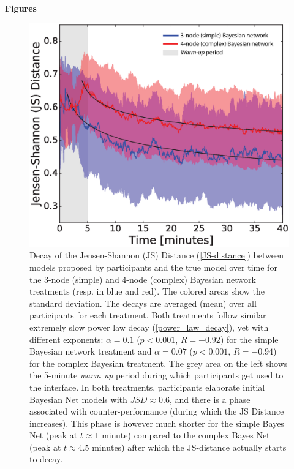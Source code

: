 \begin{center}
{\Large {\bf Figures}}
\vspace{1.5cm}
\end{center}

\begin{figure}[h!]
\begin{center}
\includegraphics[width=12cm]{figures/decay_simple_complex.eps}
\caption{\footnotesize Decay of the Jensen-Shannon (JS) Distance (\ref{JS-distance}) between models proposed by participants and the true model over time for the 3-node (simple) and 4-node (complex) Bayesian network treatments (resp. in blue and red). The colored areas show the standard deviation. The decays are averaged (mean) over all participants for each treatment. Both treatments follow similar extremely slow power law decay (\ref{power_law_decay}), yet with different exponents: $\alpha = 0.1$ ($p < 0.001$, $R = -0.92$) for the simple Bayesian network treatment and $\alpha = 0.07$ ($p < 0.001$, $R = -0.94$) for the complex Bayesian treatment. The grey area on the left shows the 5-minute {\it warm up} period during which participants get used to the interface. In both treatments, participants elaborate initial Bayesian Net models with $JSD \approx 0.6$, and there is a phase associated with counter-performance (during which the JS Distance increases). This phase is however much shorter for the simple Bayes Net (peak at $t \approx1$ minute) compared to the complex Bayes Net (peak at $t \approx 4.5$ minutes) after which the JS-distance actually starts to decay.}
\label{fig:decay}
\end{center}
\end{figure}

